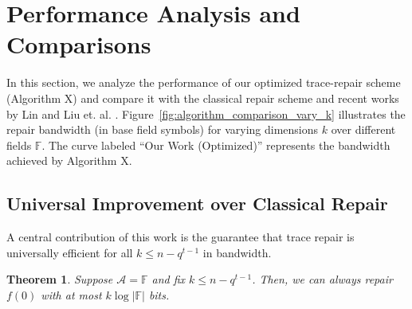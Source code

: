 \documentclass[onecolumn]{IEEEtran}
\theoremstyle{plain}
\newtheorem{theorem}{Theorem}
\theoremstyle{definition}
\newcommand{\FF}{\mathbb{F}}
\newcommand{\cS}{\mathcal{S}}
\newcommand{\cA}{\mathcal{A}}
\begin{document}

\section{Performance Analysis and Comparisons}


In this section, we analyze the performance of our optimized trace-repair scheme ({Algorithm X}) and compare it with the classical repair scheme and recent works by Lin \cite{Lin2023} and Liu et. al. \cite{Liu2024}. Figure~\ref{fig:algorithm_comparison_vary_k} illustrates the repair bandwidth (in base field symbols) for varying dimensions $k$ over different fields $\FF$. The curve labeled ``Our Work (Optimized)'' represents the bandwidth achieved by {Algorithm X}.

\subsection{Universal Improvement over Classical Repair}

A central contribution of this work is the guarantee that trace repair is universally efficient for all $k \le n - q^{t-1}$ in bandwidth.

\begin{theorem}\label{thm:outperform}
    Suppose $\cA = \FF$ and fix $k\le n - q^{t-1}$. Then, we can always repair $f(0)$ with at most $k\log |\FF|$ bits.
\end{theorem}
\end{document}

